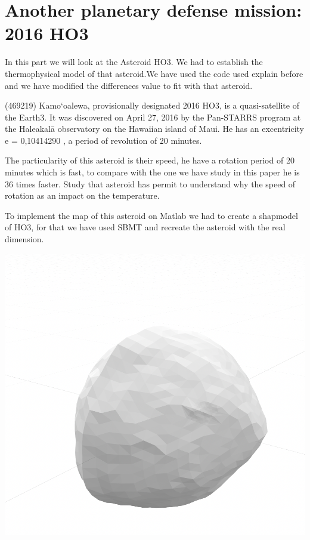 \section{Another planetary defense mission: 2016 HO3}
\label{HO3}

In this part we will look at the Asteroid HO3. We had to establish the thermophysical model of that asteroid.We have used the code used explain before and we have modified the differences value to fit with that asteroid.\newline

(469219) Kamo‘oalewa, provisionally designated 2016 HO3, is a quasi-satellite of the Earth3. It was discovered on April 27, 2016 by the Pan-STARRS program at the Haleakalā observatory on the Hawaiian island of Maui.\newline
He has an excentricity e = 0,10414290 , a period of revolution of 20 minutes.

The particularity of this asteroid is their speed, he have a rotation period of 20 minutes which is fast, to compare with the one we have study in this paper he is 36 times faster. Study that asteroid has permit to understand why the speed of rotation as an impact on the temperature.

To implement the map of this asteroid on Matlab we had to create a shapmodel of HO3, for that we have used SBMT and recreate the asteroid with the real dimension.\newline 

\begin{center}
    \captionsetup{type=figure}
    \includegraphics[scale=0.4]{rsc/HO3_shapemodel.png}
\end{center}


